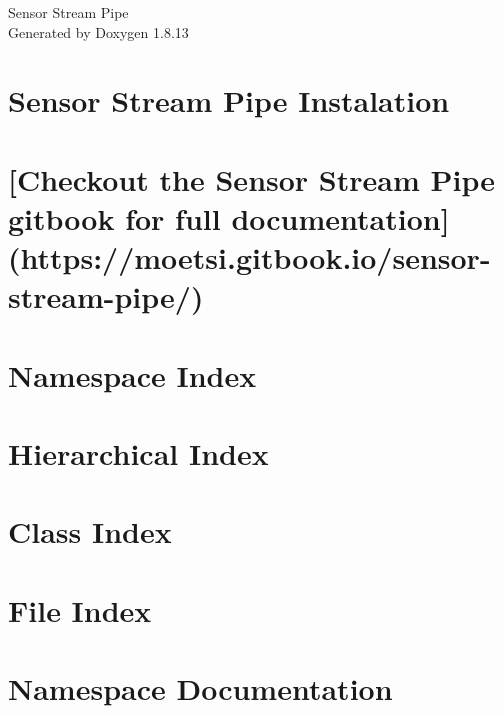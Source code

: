 \documentclass[twoside]{book}
\newcommand{\+}{\discretionary{\mbox{\scriptsize$\hookleftarrow$}}{}{}}
\newcommand{\clearemptydoublepage}{%
  \newpage{\pagestyle{empty}\cleardoublepage}%
}
\begin{document}
\hypersetup{pageanchor=false,
             bookmarksnumbered=true,
             pdfencoding=unicode
            }
\begin{titlepage}
\vspace*{7cm}
\begin{center}%
{\Large Sensor Stream Pipe }\\
\vspace*{1cm}
{\large Generated by Doxygen 1.8.13}\\
\end{center}
\end{titlepage}
\clearemptydoublepage
{}
\tableofcontents
\clearemptydoublepage
{}
\hypersetup{pageanchor=true}

\chapter{Sensor Stream Pipe Instalation}
\label{md_INSTALL}

\chapter{\mbox{[}Checkout the Sensor Stream Pipe gitbook for full documentation\mbox{]}(https\+://moetsi.gitbook.\+io/sensor-\/stream-\/pipe/)}
\label{md_README}

\chapter{Namespace Index}

\chapter{Hierarchical Index}

\chapter{Class Index}

\chapter{File Index}

\chapter{Namespace Documentation}

\end{document}
